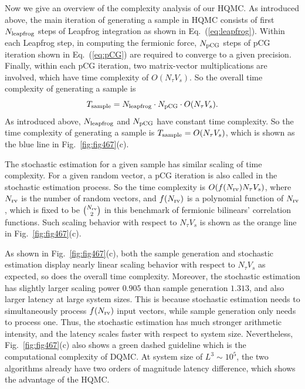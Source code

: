 \documentclass[aps,prl,twocolumn,superscriptaddress,showpacs,longbibliography]{revtex4-2}
\newcommand{\tx}[1]{\textmd{#1}}
\newcommand{\refeq}[1]{\textmd{Eq.\ }(\ref{#1})}
\newcommand{\reffg}[1]{\textmd{Fig.\ }\ref{#1}}
\begin{document}
Now we give an overview of the complexity analysis
of our HQMC. As introduced above, the main iteration of generating a sample in HQMC consists of first $N_\tx{leapfrog}$ steps of Leapfrog integration as shown in \refeq{eq:leapfrog}. Within each Leapfrog step, in computing the fermionic force, $N_\tx{pCG}$ steps of pCG iteration shown in \refeq{eq:pCG} are required to converge to a given precision. Finally, within each pCG iteration, two matrix-vector multiplications are involved, which have time complexity of $O(N_{\tau} V_s)$. So the overall time complexity of generating a sample is 
\begin{equation}
T_\tx{sample} = N_\tx{leapfrog}\cdot N_\tx{pCG} \cdot O(N_{\tau} V_s).
\end{equation}
As introduced above, $N_\tx{leapfrog}$ and $ N_\tx{pCG} $ have constant time complexity. So the  time complexity of generating a sample is $T_\tx{sample} = O(N_{\tau} V_s)$, which is shown as the blue line in \reffg{fig:fig467}(c). 

The stochastic estimation for a given sample has similar scaling of time complexity. For a given random vector, a pCG iteration is also called in the stochastic estimation process. So the time complexity is $O(f(N_
\tx{rv})N_{\tau} V_s)$, where $N_\tx{rv}$ is the number of random vectors, and $f(N_\tx{rv})$ is a polynomial function of $N_\tx{rv}$, which is fixed to be $\binom{N_\tx{rv}}{2}$ in this benchmark of fermionic bilinears' correlation functions. Such scaling behavior with respect to $N_{\tau} V_s$ is shown as the orange line in \reffg{fig:fig467}(c). 

As shown in \reffg{fig:fig467}(c), both the sample generation and stochastic estimation display nearly linear scaling behavior with respect to $N_{\tau} V_s$ as expected, so does the overall time complexity. Moreover, the stochastic estimation has slightly larger scaling power $0.905$ than sample generation $1.313$, and also larger latency at large system sizes. This is because stochastic estimation needs to simultaneously process $f(N_\tx{rv})$ input vectors, while sample generation only needs to process one. Thus, the stochastic estimation has much stronger arithmetic intensity, and the latency scales faster with respect to system size.
Nevertheless, \reffg{fig:fig467}(c) also shows a green dashed guideline which is the computational complexity of DQMC. At system size of $L^3 \sim 10^5$, the two algorithms already have two orders of magnitude latency difference, which shows the advantage of the HQMC. 
\end{document}
